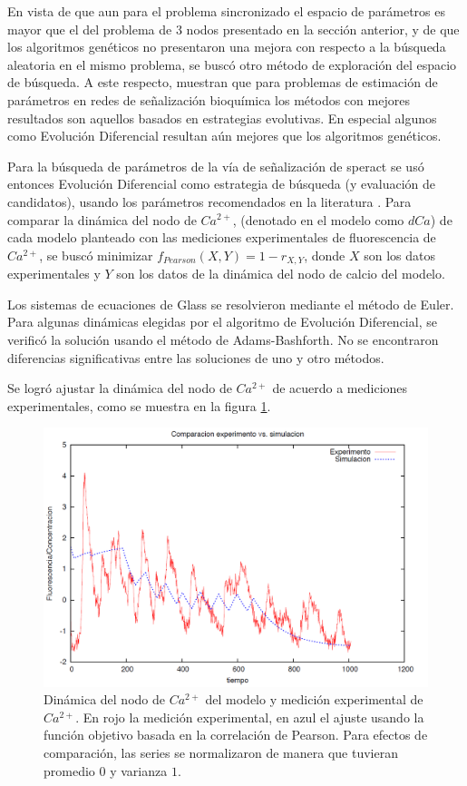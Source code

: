 En vista de que aun para el problema sincronizado el espacio de parámetros es mayor que el del problema de 3 nodos presentado en la sección anterior, y de que los algoritmos genéticos no presentaron una mejora con respecto a la búsqueda aleatoria en el mismo problema, se buscó otro método de exploración del espacio de búsqueda. A este respecto, \citeauthor{BangaMoles2003} \citep{BangaMoles2003} muestran que para problemas de estimación de parámetros en redes de señalización bioquímica los métodos con mejores resultados son aquellos basados en estrategias evolutivas. En especial algunos como Evolución Diferencial resultan aún mejores que los algoritmos genéticos.

Para la búsqueda de parámetros de la vía de señalización de speract se usó entonces Evolución Diferencial como estrategia de búsqueda (y evaluación de candidatos), usando los parámetros recomendados en la literatura \citeauthor{Storn1997}  \citep{Storn1997}. Para comparar la dinámica del nodo de $Ca^{2+}$, (denotado en el modelo como $dCa$) de cada modelo planteado con las mediciones experimentales de fluorescencia de $Ca^{2+}$, se buscó minimizar $f_{Pearson}(X,Y) = 1-r_{X,Y}$, donde $X$ son los datos experimentales y $Y$ son los datos de la dinámica del nodo de calcio del modelo. 

Los sistemas de ecuaciones de Glass se resolvieron mediante el método de Euler. Para algunas dinámicas elegidas por el algoritmo de Evolución Diferencial, se verificó la solución usando el método de Adams-Bashforth. No se encontraron diferencias significativas entre las soluciones de uno y otro métodos.

Se logró ajustar la dinámica del nodo de $Ca^{2+}$ de acuerdo a mediciones experimentales, como se muestra en la figura \ref{fig:glassChido}. 

\begin{figure}[h]
\includegraphics[width=0.9\linewidth]{gfx/glassChido}
\caption[Dinámica del nodo de $Ca^{2+}$ del modelo y medición experimental de $Ca^{2+}$]{Dinámica del nodo de $Ca^{2+}$ del modelo y medición experimental de $Ca^{2+}$. En rojo la medición experimental, en azul el ajuste usando la función objetivo basada en la correlación de Pearson. Para efectos de comparación, las series se normalizaron de manera que tuvieran promedio $0$ y varianza $1$.}\label{fig:glassChido}
\end{figure}

